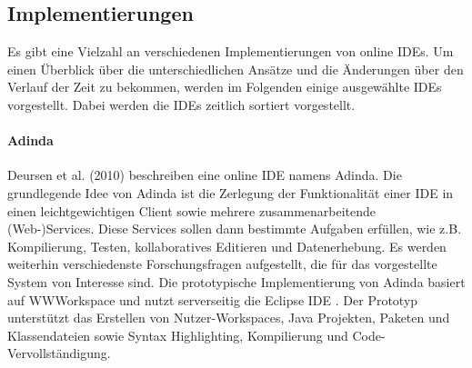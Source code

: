 \subsection{Implementierungen}\label{section:stand-der-technik:literaturrecherche:implementierungen}

Es gibt eine Vielzahl an verschiedenen Implementierungen von online IDEs. Um einen Überblick über die unterschiedlichen Ansätze und die Änderungen über den Verlauf der Zeit zu bekommen, werden im Folgenden einige ausgewählte IDEs vorgestellt. Dabei werden die IDEs zeitlich sortiert vorgestellt.

\paragraph{Adinda}
Deursen et al. (2010) \cite{van_deursen_adinda_2010} beschreiben eine online IDE namens Adinda. Die grundlegende Idee von Adinda ist die Zerlegung der Funktionalität einer IDE in einen leichtgewichtigen Client sowie mehrere zusammenarbeitende (Web-)Services. Diese Services sollen dann bestimmte Aufgaben erfüllen, wie z.B. Kompilierung, Testen, kollaboratives Editieren und Datenerhebung. Es werden weiterhin verschiedenste Forschungsfragen aufgestellt, die für das vorgestellte System von Interesse sind. Die prototypische Implementierung von Adinda basiert auf WWWorkspace \cite{ryan_web_2007} und nutzt serverseitig die Eclipse IDE \cite{noauthor_eclipse_nodate}. Der Prototyp unterstützt das Erstellen von Nutzer-Workspaces, Java Projekten, Paketen und Klassendateien sowie Syntax Highlighting, Kompilierung und Code-Vervollständigung.

